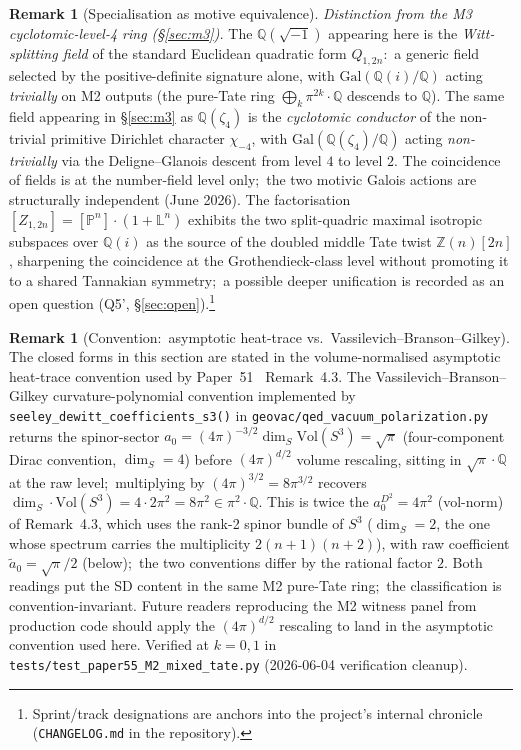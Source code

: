 \documentclass[11pt,a4paper]{article}
\theoremstyle{plain}
\theoremstyle{definition}
\newtheorem{remark}[theorem]{Remark}
\newcommand{\sthree}{S^{3}}
\newcommand{\Z}{\mathbb{Z}}
\newcommand{\Q}{\mathbb{Q}}
\newcommand{\Vol}{\mathrm{Vol}}
\begin{document}
\begin{remark}[Specialisation as motive equivalence]
\textit{Distinction from the M3 cyclotomic-level-4 ring (\S\ref{sec:m3}).}
The $\Q(\sqrt{-1})$ appearing here is the \emph{Witt-splitting field} of the
standard Euclidean quadratic form $Q_{1, 2n}$:\ a generic field selected by
the positive-definite signature alone, with $\mathrm{Gal}(\Q(i)/\Q)$ acting
\emph{trivially} on M2 outputs (the pure-Tate ring
$\bigoplus_k \pi^{2k}\cdot\Q$ descends to $\Q$).  The same field appearing
in \S\ref{sec:m3} as $\Q(\zeta_4)$ is the \emph{cyclotomic conductor} of the
non-trivial primitive Dirichlet character $\chi_{-4}$, with
$\mathrm{Gal}(\Q(\zeta_4)/\Q)$ acting \emph{non-trivially} via the
Deligne--Glanois descent from level $4$ to level $2$.  The coincidence of
fields is at the number-field level only;\ the two motivic Galois actions
are structurally independent (June 2026).  The
factorisation $[Z_{1, 2n}] = [\mathbb{P}^n] \cdot (1 + \mathbb{L}^n)$
exhibits the two split-quadric maximal isotropic subspaces over $\Q(i)$ as
the source of the doubled middle Tate twist $\Z(n)[2n]$, sharpening the
coincidence at the Grothendieck-class level without promoting it to a
shared Tannakian symmetry;\ a possible deeper unification is recorded as
an open question (Q5', \S\ref{sec:open}).\footnote{Sprint/track designations are anchors into the project's internal chronicle (\texttt{CHANGELOG.md} in the repository).}
\end{remark}

\begin{remark}[Convention:\ asymptotic heat-trace vs.\ Vassilevich--Branson--Gilkey]
\label{rem:m2_convention}
The closed forms in this section are stated in the volume-normalised
asymptotic heat-trace convention used by Paper~51~\cite{loutey_paper51}
Remark~4.3.  The Vassilevich--Branson--Gilkey curvature-polynomial convention
implemented by \texttt{seeley\_dewitt\_coefficients\_s3()} in
\texttt{geovac/qed\_vacuum\_polarization.py} returns the spinor-sector
$a_0 = (4\pi)^{-3/2}\dim_S\Vol(\sthree) = \sqrt\pi$ (four-component
Dirac convention, $\dim_S = 4$) before $(4\pi)^{d/2}$
volume rescaling, sitting in $\sqrt\pi \cdot \Q$ at the raw level;\
multiplying by $(4\pi)^{3/2} = 8\pi^{3/2}$ recovers
$\dim_S \cdot \Vol(\sthree) = 4 \cdot 2\pi^2 = 8\pi^2 \in \pi^2 \cdot \Q$.
This is twice the $a_0^{D^2} = 4\pi^2$ (vol-norm) of
\cite{loutey_paper51} Remark~4.3, which uses the rank-2 spinor
bundle of $\sthree$ ($\dim_S = 2$, the one whose spectrum carries the
multiplicity $2(n+1)(n+2)$), with raw coefficient
$\tilde a_0 = \sqrt\pi/2$ (below);\ the two conventions differ by the
rational factor $2$.
Both readings put the SD content in the same M2 pure-Tate ring;\ the
classification is convention-invariant.  Future readers reproducing the
M2 witness panel from production code should apply the $(4\pi)^{d/2}$
rescaling to land in the asymptotic convention used here.  Verified at
$k = 0, 1$ in \texttt{tests/test\_paper55\_M2\_mixed\_tate.py}
(2026-06-04 verification cleanup).
\end{remark}
\end{document}
